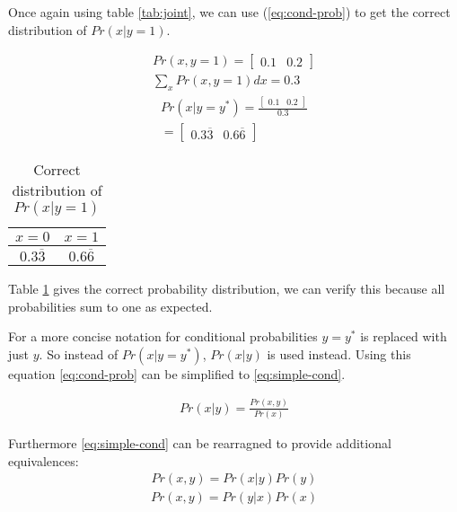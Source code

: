 \documentclass{article}
\begin{document}
Once again using table \ref{tab:joint}, we can use (\ref{eq:cond-prob}) to get the correct distribution of $Pr\left( x|y=1 \right)$.

\begin{align*}
	Pr\left( x,y=1 \right) = \begin{bmatrix} 0.1 & 0.2 \end{bmatrix}   \\
	\sum_{x} Pr(x,y=1)dx = 0.3
\end{align*}
\begin{align*}
	Pr\left( x|y=y^* \right) = \frac{\begin{bmatrix} 0.1 & 0.2 \end{bmatrix} }{0.3} \\
	= \begin{bmatrix} 0.3\overline{3}& 0.6\overline{6} \end{bmatrix}  
\end{align*}

\begin{table}[htpb]
	\centering
	\caption{Correct distribution of $Pr(x|y=1)$}
	\label{tab:correct-cond-x}

	\begin{tabular}{cc}
	$x=0$ & $x=1$ \\
	\hline
	$0.3\overline{3}$ & $0.6\overline{6}$
	\end{tabular}
\end{table}

Table \ref{tab:correct-cond-x} gives the correct probability distribution, we can verify this because all probabilities sum to one as expected.

For a more concise notation for conditional probabilities $y=y^*$ is replaced with just $y$. So instead of $Pr\left( x|y=y^* \right) $, $Pr\left( x|y \right) $ is used instead. Using this equation \ref{eq:cond-prob} can be simplified to \ref{eq:simple-cond}. 

\begin{align} \label{eq:simple-cond}
	Pr\left( x|y \right) =\frac{Pr\left( x,y \right) }{Pr\left( x \right) }
\end{align}

Furthermore \ref{eq:simple-cond} can be rearragned to provide additional equivalences:
\begin{align}\label{eq:cond-x}
	Pr\left( x,y \right) = Pr\left( x|y \right) Pr(y)
\end{align}
\begin{align}\label{eq:cond-y}
	Pr(x,y)=Pr\left( y|x \right) Pr(x)
\end{align}
\end{document}
